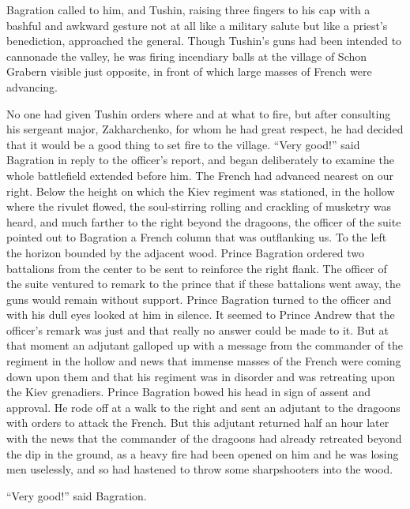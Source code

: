Bagration called to him, and Tushin, raising three fingers to his
cap with a bashful and awkward gesture not at all like a military
salute but like a priest's benediction, approached the
general. Though Tushin's guns had been intended to cannonade the
valley, he was firing incendiary balls at the village of Schon
Grabern visible just opposite, in front of which large masses of
French were advancing.

No one had given Tushin orders where and at what to fire, but
after consulting his sergeant major, Zakharchenko, for whom he
had great respect, he had decided that it would be a good thing
to set fire to the village. ``Very good!'' said Bagration in
reply to the officer's report, and began deliberately to examine
the whole battlefield extended before him. The French had
advanced nearest on our right. Below the height on which the Kiev
regiment was stationed, in the hollow where the rivulet flowed,
the soul-stirring rolling and crackling of musketry was heard,
and much farther to the right beyond the dragoons, the officer of
the suite pointed out to Bagration a French column that was
outflanking us.  To the left the horizon bounded by the adjacent
wood. Prince Bagration ordered two battalions from the center to
be sent to reinforce the right flank. The officer of the suite
ventured to remark to the prince that if these battalions went
away, the guns would remain without support.  Prince Bagration
turned to the officer and with his dull eyes looked at him in
silence. It seemed to Prince Andrew that the officer's remark was
just and that really no answer could be made to it. But at that
moment an adjutant galloped up with a message from the commander
of the regiment in the hollow and news that immense masses of the
French were coming down upon them and that his regiment was in
disorder and was retreating upon the Kiev grenadiers. Prince
Bagration bowed his head in sign of assent and approval. He rode
off at a walk to the right and sent an adjutant to the dragoons
with orders to attack the French. But this adjutant returned half
an hour later with the news that the commander of the dragoons
had already retreated beyond the dip in the ground, as a heavy
fire had been opened on him and he was losing men uselessly, and
so had hastened to throw some sharpshooters into the wood.

``Very good!'' said Bagration.

